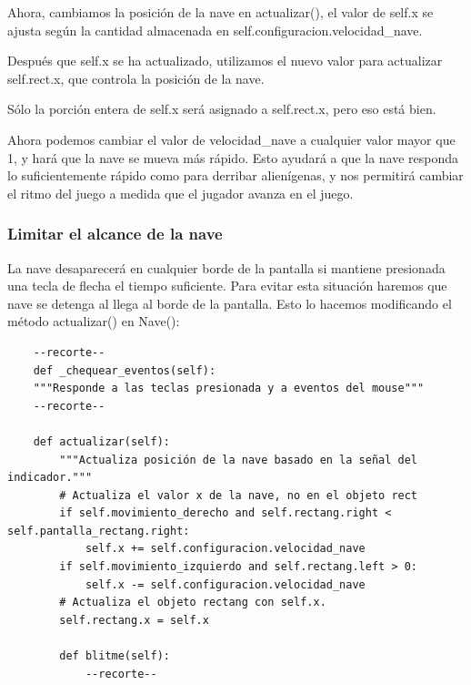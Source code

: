 Ahora,  cambiamos la posición de la nave en {\ttfamily actualizar()}, el valor de  {\ttfamily self.x} se ajusta según la cantidad 
almacenada en {\ttfamily self.configuracion.velocidad\_nave}. 

Después que  {\ttfamily self.x} se ha actualizado, utilizamos el nuevo valor para actualizar {\ttfamily self.rect.x}, que controla
la posición de la nave. 

Sólo la porción entera de  {\ttfamily self.x} será asignado a {\ttfamily self.rect.x}, pero eso está bien.


Ahora podemos cambiar el valor de {\ttfamily velocidad\_nave} a cualquier valor mayor que 1, y  hará que la nave se mueva más rápido. 
Esto ayudará a que la nave responda lo suficientemente rápido como para derribar alienígenas, y nos permitirá cambiar el ritmo
del juego a medida que el jugador avanza en el juego.

\subsubsection{Limitar el alcance de la nave}

La nave desaparecerá en cualquier borde de la pantalla si mantiene presionada una tecla de flecha el tiempo suficiente. 
Para evitar esta situación haremos que nave se detenga al llega al borde de la pantalla. Esto lo hacemos modificando el
método {\ttfamily actualizar()} en {\ttfamily Nave()}:



\hspace{-2.5cm}{\ttfamily \scriptsize curso.py}  \vspace{-0.5cm}
\begin{lstlisting}		
    --recorte--		
    def _chequear_eventos(self):
    """Responde a las teclas presionada y a eventos del mouse"""
    --recorte-- 

    def actualizar(self):
        """Actualiza posición de la nave basado en la señal del indicador."""
        # Actualiza el valor x de la nave, no en el objeto rect       
        if self.movimiento_derecho and self.rectang.right < self.pantalla_rectang.right:        
            self.x += self.configuracion.velocidad_nave        
        if self.movimiento_izquierdo and self.rectang.left > 0:       
            self.x -= self.configuracion.velocidad_nave      	
        # Actualiza el objeto rectang con self.x.
        self.rectang.x = self.x
       
        def blitme(self):
            --recorte-- 
\end{lstlisting}

